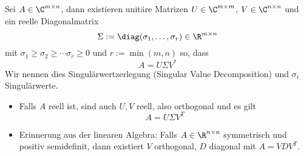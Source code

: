 \documentclass[11pt]{scrartcl}
\begin{document}
\begin{st}
	\label{1.37}
	Sei $A\in \C^{m\times n}$, dann existieren unitäre Matrizen $U\in \C^{m\times m}$, $V\in \C^{n\times n}$ und ein reelle Diagonalmatrix
	\[
		\Sigma := \diag( \sigma_1, \dotsc, \sigma_r)  \in \R^{m\times n}
	\]
	mit $\sigma_1\ge \sigma_2 \ge \dotsb \sigma_r \ge 0$ und $r:= \min(m,n)$ so, dass
	\[
		A = U \Sigma V^*
	\]
	Wir nennen dies Singulärwertzerlegung (Singular Value Decomposition) und $\sigma_i$ Singulärwerte.
	\begin{note}
		\begin{itemize}
			\item
				Falls $A$ reell ist, sind auch $U,V$ reell, also orthogonal und es gilt
				\[
					A=U\Sigma V^T
				\]
			\item
				Erinnerung aus der linearen Algebra:
				Falls $A \in \R^{n\times n}$ symmetrisch und positiv semidefinit, dann existiert $V$ orthogonal, $D$ diagonal mit $A=VDV^T$.


\end{itemize}
\end{note}
\end{st}
\end{document}

